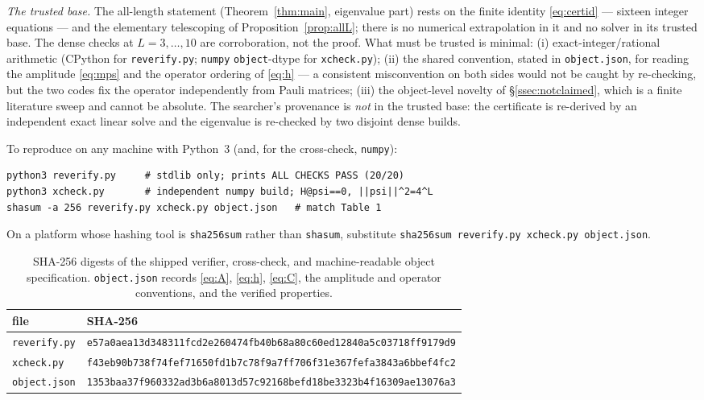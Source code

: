 \documentclass[11pt]{amsart}
\theoremstyle{plain}
\theoremstyle{definition}
\theoremstyle{remark}
\begin{document}
\emph{The trusted base.} The all-length statement (Theorem~\ref{thm:main},
eigenvalue part) rests on the finite identity \eqref{eq:certid} --- sixteen
integer equations --- and the elementary telescoping of
Proposition~\ref{prop:allL}; there is no numerical extrapolation in it and
no solver in its trusted base. The dense checks at $L=3,\dots,10$ are
corroboration, not the proof. What must be trusted is minimal:
(i) exact-integer/rational arithmetic (CPython for \texttt{reverify.py};
\texttt{numpy} \texttt{object}-dtype for \texttt{xcheck.py}); (ii) the
shared convention, stated in \texttt{object.json}, for reading the
amplitude \eqref{eq:mps} and the operator ordering of \eqref{eq:h} --- a
consistent misconvention on both sides would not be caught by re-checking,
but the two codes fix the operator independently from Pauli matrices;
(iii) the object-level novelty of \S\ref{ssec:notclaimed}, which is a
finite literature sweep and cannot be absolute. The searcher's provenance is
\emph{not} in the trusted base: the certificate is re-derived by an
independent exact linear solve and the eigenvalue is re-checked by two
disjoint dense builds.

To reproduce on any machine with Python~3 (and, for the cross-check,
\texttt{numpy}):
\begin{verbatim}
python3 reverify.py     # stdlib only; prints ALL CHECKS PASS (20/20)
python3 xcheck.py       # independent numpy build; H@psi==0, ||psi||^2=4^L
shasum -a 256 reverify.py xcheck.py object.json   # match Table 1
\end{verbatim}
\noindent On a platform whose hashing tool is \texttt{sha256sum} rather than
\texttt{shasum}, substitute \texttt{sha256sum reverify.py xcheck.py
object.json}.

\begin{table}[ht]
\small
\begin{center}
\begin{tabular}{ll}
\toprule
file & SHA-256 \\
\midrule
\texttt{reverify.py} &
\texttt{e57a0aea13d348311fcd2e260474fb40b68a80c60ed12840a5c03718ff9179d9} \\
\texttt{xcheck.py} &
\texttt{f43eb90b738f74fef71650fd1b7c78f9a7ff706f31e367fefa3843a6bbef4fc2} \\
\texttt{object.json} &
\texttt{1353baa37f960332ad3b6a8013d57c92168befd18be3323b4f16309ae13076a3} \\
\bottomrule
\end{tabular}
\end{center}
\medskip
\caption{SHA-256 digests of the shipped verifier, cross-check, and
machine-readable object specification. \texttt{object.json} records
\eqref{eq:A}, \eqref{eq:h}, \eqref{eq:C}, the amplitude and operator
conventions, and the verified properties.}
\label{tab:sha}
\end{table}
\end{document}
